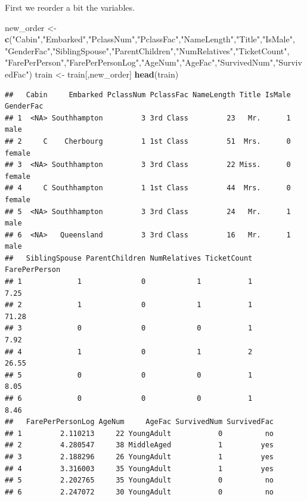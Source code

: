 \documentclass[]{article}
\newenvironment{Shaded}{\begin{snugshade}}{\end{snugshade}}
\newcommand{\KeywordTok}[1]{\textcolor[rgb]{0.13,0.29,0.53}{\textbf{#1}}}
\newcommand{\StringTok}[1]{\textcolor[rgb]{0.31,0.60,0.02}{#1}}
\newcommand{\NormalTok}[1]{#1}
\begin{document}
First we reorder a bit the variables.

\begin{Shaded}
\begin{Highlighting}[]
\NormalTok{new_order <-}\StringTok{ }\KeywordTok{c}\NormalTok{(}\StringTok{"Cabin"}\NormalTok{,}\StringTok{"Embarked"}\NormalTok{,}\StringTok{"PclassNum"}\NormalTok{,}\StringTok{"PclassFac"}\NormalTok{,}\StringTok{"NameLength"}\NormalTok{,}\StringTok{"Title"}\NormalTok{,}\StringTok{"IsMale"}\NormalTok{,}
               \StringTok{"GenderFac"}\NormalTok{,}\StringTok{"SiblingSpouse"}\NormalTok{,}\StringTok{"ParentChildren"}\NormalTok{,}\StringTok{"NumRelatives"}\NormalTok{,}\StringTok{"TicketCount"}\NormalTok{,}
               \StringTok{"FarePerPerson"}\NormalTok{,}\StringTok{"FarePerPersonLog"}\NormalTok{,}\StringTok{"AgeNum"}\NormalTok{,}\StringTok{"AgeFac"}\NormalTok{,}\StringTok{"SurvivedNum"}\NormalTok{,}\StringTok{"SurvivedFac"}\NormalTok{)}
\NormalTok{train <-}\StringTok{ }\NormalTok{train[,new_order]}
\KeywordTok{head}\NormalTok{(train)}
\end{Highlighting}
\end{Shaded}

\begin{verbatim}
##   Cabin     Embarked PclassNum PclassFac NameLength Title IsMale GenderFac
## 1  <NA> Southhampton         3 3rd Class         23   Mr.      1      male
## 2     C    Cherbourg         1 1st Class         51  Mrs.      0    female
## 3  <NA> Southhampton         3 3rd Class         22 Miss.      0    female
## 4     C Southhampton         1 1st Class         44  Mrs.      0    female
## 5  <NA> Southhampton         3 3rd Class         24   Mr.      1      male
## 6  <NA>   Queensland         3 3rd Class         16   Mr.      1      male
##   SiblingSpouse ParentChildren NumRelatives TicketCount FarePerPerson
## 1             1              0            1           1          7.25
## 2             1              0            1           1         71.28
## 3             0              0            0           1          7.92
## 4             1              0            1           2         26.55
## 5             0              0            0           1          8.05
## 6             0              0            0           1          8.46
##   FarePerPersonLog AgeNum     AgeFac SurvivedNum SurvivedFac
## 1         2.110213     22 YoungAdult           0          no
## 2         4.280547     38 MiddleAged           1         yes
## 3         2.188296     26 YoungAdult           1         yes
## 4         3.316003     35 YoungAdult           1         yes
## 5         2.202765     35 YoungAdult           0          no
## 6         2.247072     30 YoungAdult           0          no
\end{verbatim}
\end{document}
